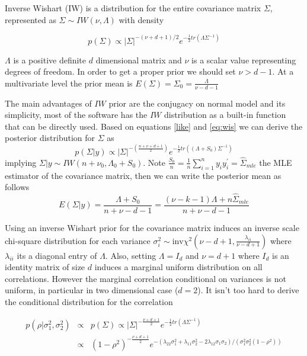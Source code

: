 \documentclass{article}
\begin{document}
Inverse Wishart (IW) is a distribution for the entire covariance matrix $\Sigma$, represented as $\Sigma \sim IW(\nu,\Lambda)$ with density
 
 \begin{equation} 
p(\Sigma) \propto  |\Sigma|^{-(\nu+ d +1)/2 } e^{-\frac{1}{2} tr( \Lambda \Sigma^{-1}) }
\label{eq:wis}
\end{equation}

$\Lambda$ is a positive definite $d$ dimensional matrix and $\nu$ is a scalar value representing degrees of freedom. In order to get a proper prior we should set $\nu > d-1$. At a multivariate level the prior mean is $E(\Sigma) = \Sigma_0= \frac{\Lambda}{\nu - d - 1}$ 

The main advantages of $IW$ prior are the conjugacy on normal model and its simplicity, most of the software has the $IW$ distribution as a built-in function that can be directly used. Based on equations \ref{like} and \ref{eq:wis} we can derive the posterior distribution for $\Sigma$ as 
 \[
  p(\Sigma\vert y ) \propto |\Sigma|^{ -\left(\frac{n+\nu+d+1}{2} \right)} e^{- \frac{1}{2} tr( (\Lambda+S_0)\Sigma^{-1})}
 \] 
implying $\Sigma \vert y \sim IW(n+\nu_0, \Lambda_0+S_0)$. Note $\frac{S_0}{n} = \frac{1}{n} \sum_{i=1}^n y_i y_i^{'} = \hat\Sigma_{mle}$ the MLE estimator of the covariance matrix, then we can write the posterior mean as follows 
\[  E(\Sigma\vert y) = \frac{\Lambda + S_0}{n+\nu-d-1} = \frac{ (\nu - k-1)\Lambda + n\hat\Sigma_{mle} } {n+\nu-d-1}  \] 

Using an inverse Wishart prior for the covariance matrix induces an inverse scale chi-square distribution for each variance $\sigma_i^2\sim \mbox{inv}\chi^2(\nu - d + 1, \frac{\lambda_{ii}}{\nu-d+1} )$ where $\lambda_{ii}$ its a diagonal entry of $\Lambda$.  Also,  setting $\Lambda=I_d$ and $\nu=d+1$ where $I_d$ is an identity matrix of size $d$ induces a marginal uniform distribution on all correlations. However the marginal correlation conditional on variances is not uniform, in particular in two dimensional case ($d=2$). It isn't too hard to derive the conditional distribution for the correlation
   
\begin{eqnarray}
\nonumber p(\rho \vert \sigma_1^2,\sigma_2^2) &\propto & p(\Sigma) \propto | \Sigma |^{-\frac{\nu+d+1}{2} }  e^{-\frac{1}{2} tr\left(\Lambda \Sigma^{-1}\right)} \\
\nonumber &\propto & (1-\rho^2)^{-\frac{\nu+d+1}{2}}e^{-(\lambda_{22} \sigma_1^2+\lambda_{11} \sigma_2^2 - 2\lambda_{12}\sigma_1\sigma_2)/(\sigma_1^2 \sigma_2^2(1-\rho^2)) }  
\end{eqnarray}
\end{document}
